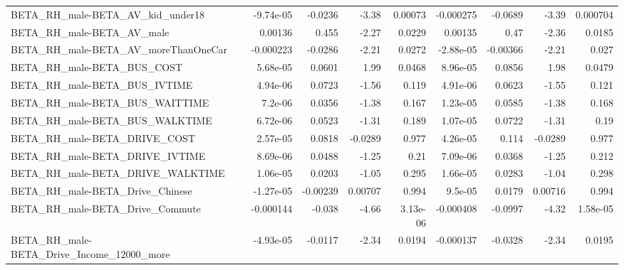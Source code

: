 \begin{tabular}{lrrrrrrrr}
BETA\_RH\_male-BETA\_AV\_kid\_under18                   &   -9.74e-05 &      -0.0236 &    -3.38 &  0.00073 &  -0.000275 &     -0.0689 &        -3.39 &      0.000704 \\
BETA\_RH\_male-BETA\_AV\_male                          &     0.00136 &        0.455 &    -2.27 &   0.0229 &    0.00135 &        0.47 &        -2.36 &        0.0185 \\
BETA\_RH\_male-BETA\_AV\_moreThanOneCar                &   -0.000223 &      -0.0286 &    -2.21 &   0.0272 &  -2.88e-05 &    -0.00366 &        -2.21 &         0.027 \\
BETA\_RH\_male-BETA\_BUS\_COST                         &    5.68e-05 &       0.0601 &     1.99 &   0.0468 &   8.96e-05 &      0.0856 &         1.98 &        0.0479 \\
BETA\_RH\_male-BETA\_BUS\_IVTIME                       &    4.94e-06 &       0.0723 &    -1.56 &    0.119 &   4.91e-06 &      0.0623 &        -1.55 &         0.121 \\
BETA\_RH\_male-BETA\_BUS\_WAITTIME                     &     7.2e-06 &       0.0356 &    -1.38 &    0.167 &   1.23e-05 &      0.0585 &        -1.38 &         0.168 \\
BETA\_RH\_male-BETA\_BUS\_WALKTIME                     &    6.72e-06 &       0.0523 &    -1.31 &    0.189 &   1.07e-05 &      0.0722 &        -1.31 &          0.19 \\
BETA\_RH\_male-BETA\_DRIVE\_COST                       &    2.57e-05 &       0.0818 &  -0.0289 &    0.977 &   4.26e-05 &       0.114 &      -0.0289 &         0.977 \\
BETA\_RH\_male-BETA\_DRIVE\_IVTIME                     &    8.69e-06 &       0.0488 &    -1.25 &     0.21 &   7.09e-06 &      0.0368 &        -1.25 &         0.212 \\
BETA\_RH\_male-BETA\_DRIVE\_WALKTIME                   &    1.06e-05 &       0.0203 &    -1.05 &    0.295 &   1.66e-05 &      0.0283 &        -1.04 &         0.298 \\
BETA\_RH\_male-BETA\_Drive\_Chinese                    &   -1.27e-05 &     -0.00239 &  0.00707 &    0.994 &    9.5e-05 &      0.0179 &      0.00716 &         0.994 \\
BETA\_RH\_male-BETA\_Drive\_Commute                    &   -0.000144 &       -0.038 &    -4.66 & 3.13e-06 &  -0.000408 &     -0.0997 &        -4.32 &      1.58e-05 \\
BETA\_RH\_male-BETA\_Drive\_Income\_12000\_more          &   -4.93e-05 &      -0.0117 &    -2.34 &   0.0194 &  -0.000137 &     -0.0328 &        -2.34 &        0.0195 \\

\end{tabular}
